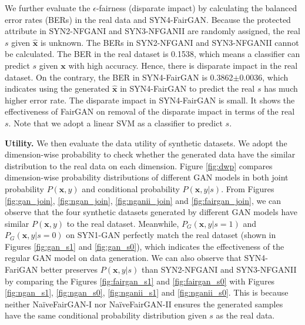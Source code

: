 \documentclass[sigconf]{acmart}
\theoremstyle{definition}
\begin{document}
We further evaluate the $\epsilon$-fairness (disparate impact) by calculating the balanced error rates (BERs) in the real data and SYN4-FairGAN. Because the protected attribute in SYN2-NFGANI and SYN3-NFGANII are randomly assigned, the real $s$ given  $\hat{\mathbf{x}}$ is unknown. The BERs in SYN2-NFGANI and SYN3-NFGANII cannot be calculated. The BER in the real dataset is 0.1538, which means a classifier can predict $s$  given $\mathbf{x}$ with high accuracy. Hence, there is disparate impact in the real dataset. On the contrary, the BER in SYN4-FairGAN is 0.3862$\pm$0.0036, which indicates using the generated $\hat{\mathbf{x}}$ in SYN4-FairGAN to predict the real $s$ has much higher error rate. The disparate impact in SYN4-FairGAN is small. It shows the effectiveness of FairGAN on removal of the disparate impact in terms of the real $s$. Note that we adopt a linear SVM as a classifier to predict $s$.  


{\bf \noindent Utility.}
We then evaluate the data utility of synthetic datasets. We adopt the dimension-wise probability to check whether the generated data have the similar distribution to the real data on each dimension. Figure \ref{fig:dwp} compares dimension-wise probability distributions of different GAN models in both joint probability $P(\mathbf{x}, y)$ and conditional probability $P(\mathbf{x},y|s)$. From Figures \ref{fig:gan_join}, \ref{fig:ngan_join}, \ref{fig:nganii_join} and \ref{fig:fairgan_join}, we can observe that the four synthetic datasets generated by different GAN models have similar $P(\mathbf{x}, y)$ to the real dataset. Meanwhile, $P_G(\mathbf{x},y|s=1)$ and $P_G(\mathbf{x},y|s=0)$ on SYN1-GAN perfectly match the real dataset (shown in Figures \ref{fig:gan_s1} and \ref{fig:gan_s0}), which indicates the effectiveness of the regular GAN model on data generation. We can also observe that SYN4-FariGAN better preserves $P(\mathbf{x},y|s)$ than SYN2-NFGANI and SYN3-NFGANII by comparing the Figures \ref{fig:fairgan_s1} and \ref{fig:fairgan_s0} with Figures \ref{fig:ngan_s1}, \ref{fig:ngan_s0}, \ref{fig:nganii_s1} and \ref{fig:nganii_s0}. This is because neither Na\"iveFairGAN-I nor Na\"iveFairGAN-II ensures the generated samples have the same conditional probability distribution given $s$ as the real data.
\end{document}
